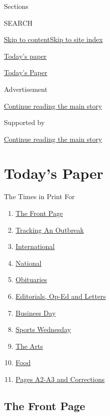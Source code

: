 Sections

SEARCH

\protect\hyperlink{site-content}{Skip to
content}\protect\hyperlink{site-index}{Skip to site index}

\href{https://www.nytimes3xbfgragh.onion/section/todayspaper}{Today's
paper}

\href{https://myaccount.nytimes3xbfgragh.onion/auth/login?response_type=cookie\&client_id=vi}{}

\href{https://www.nytimes3xbfgragh.onion/section/todayspaper}{Today's
Paper}

Advertisement

\protect\hyperlink{after-top}{Continue reading the main story}

Supported by

\protect\hyperlink{after-sponsor}{Continue reading the main story}

\hypertarget{todays-paper}{%
\section{Today's Paper}\label{todays-paper}}

The Times in Print For

\begin{enumerate}
\def\labelenumi{\arabic{enumi}.}
\tightlist
\item
  \protect\hyperlink{thefrontpage}{The Front Page}
\item
  \protect\hyperlink{trackinganoutbreak}{Tracking An Outbreak}
\item
  \protect\hyperlink{international}{International}
\item
  \protect\hyperlink{national}{National}
\item
  \protect\hyperlink{obituaries}{Obituaries}
\item
  \protect\hyperlink{editorialsux2cop-edandletters}{Editorials, Op-Ed
  and Letters}
\item
  \protect\hyperlink{businessday}{Business Day}
\item
  \protect\hyperlink{sportswednesday}{Sports Wednesday}
\item
  \protect\hyperlink{thearts}{The Arts}
\item
  \protect\hyperlink{food}{Food}
\item
  \protect\hyperlink{pagesa2-a3andcorrections}{Pages A2-A3 and
  Corrections}
\end{enumerate}

\hypertarget{the-front-page}{%
\subsection{The Front Page}\label{the-front-page}}

